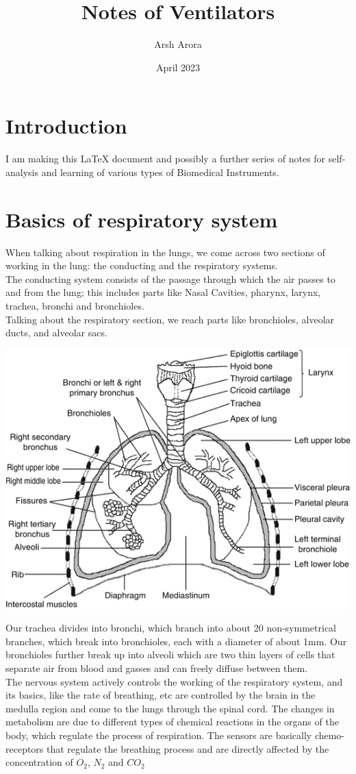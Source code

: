 \documentclass{article}
\title{Notes of Ventilators}
\author{Arsh Arora}
\date{April 2023}
\begin{document}
\maketitle

\section{Introduction}

I am making this LaTeX document and possibly a further series of notes for self-analysis and learning of various types of Biomedical Instruments.

\section{Basics of respiratory system}
When talking about respiration in the lungs, we come across two sections of working in the lung: the conducting and the respiratory systems. \\
The conducting system consists of the passage through which the air passes to and from the lung; this includes parts like Nasal Cavities, pharynx, larynx, trachea, bronchi and bronchioles. \\Talking about the respiratory section, we reach parts like bronchioles, alveolar ducts, and alveolar sacs. 
\begin{center}
    \includegraphics[scale=0.5]{9359695e86e27f8daa0bc719608a6029.png}
\end{center}
Our trachea divides into bronchi, which branch into about 20 non-symmetrical branches, which break into bronchioles, each with a diameter of about 1mm. Our bronchioles further break up into alveoli which are two thin layers of cells that separate air from blood and gasses and can freely diffuse between them. \\
The nervous system actively controls the working of the respiratory system, and its basics, like the rate of breathing, etc are controlled by the brain in the medulla region and come to the lungs through the spinal cord. The changes in metabolism are due to different types of chemical reactions in the organs of the body, which regulate the process of respiration. The sensors are basically chemo-receptors that regulate the breathing process and are directly affected by the concentration of $O_2$, $N_2$ and $CO_2$
\end{document}
